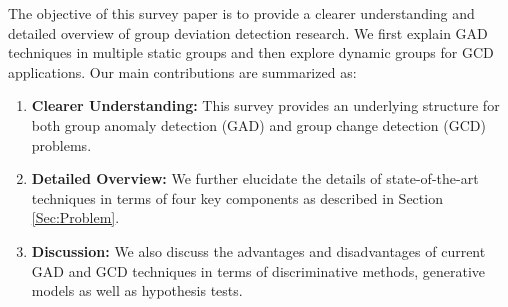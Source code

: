

{ 
The objective of this survey paper is to provide a clearer understanding and detailed  overview of group deviation detection research.  %
 We first explain GAD techniques  in multiple static groups and then explore dynamic groups for GCD applications. %
Our  main contributions are  summarized as: %
\begin{enumerate}
\item {\bf Clearer Understanding:} 
This survey provides an underlying structure for   both group anomaly detection (GAD) and group change detection (GCD) problems.      %
\item {\bf Detailed Overview:} 
 We further elucidate the details of state-of-the-art techniques in terms of four key components as described in Section \ref{Sec:Problem}. 
\item {\bf Discussion:} We also discuss the advantages and disadvantages of current GAD and GCD techniques in terms of discriminative methods, generative models  as well as hypothesis tests. 
\end{enumerate}
 
}
